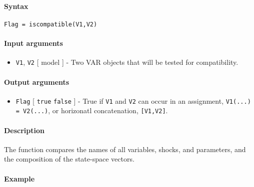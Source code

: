 


	\paragraph{Syntax}\label{syntax}

\begin{verbatim}
Flag = iscompatible(V1,V2)
\end{verbatim}

\paragraph{Input arguments}\label{input-arguments}

\begin{itemize}
\itemsep1pt\parskip0pt
\item
  \texttt{V1}, \texttt{V2} {[} model {]} - Two VAR objects that will be
  tested for compatibility.
\end{itemize}

\paragraph{Output arguments}\label{output-arguments}

\begin{itemize}
\itemsep1pt\parskip0pt
\item
  \texttt{Flag} {[} \texttt{true} \textbar{} \texttt{false} {]} - True
  if \texttt{V1} and \texttt{V2} can occur in an assignment,
  \texttt{V1(...) = V2(...)}, or horizonatl concatenation,
  \texttt{{[}V1,V2{]}}.
\end{itemize}

\paragraph{Description}\label{description}

The function compares the names of all variables, shocks, and
parameters, and the composition of the state-space vectors.

\paragraph{Example}\label{example}


